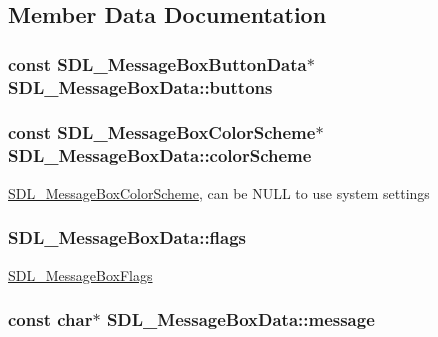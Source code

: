 \subsection{Member Data Documentation}
\hypertarget{struct_s_d_l___message_box_data_a265e47aab749e384661ae91d3e11e0db}{
\subsubsection[{buttons}]{\setlength{\rightskip}{0pt plus 5cm}const {\bf S\-D\-L\-\_\-\-Message\-Box\-Button\-Data}$\ast$ S\-D\-L\-\_\-\-Message\-Box\-Data\-::buttons}}\label{struct_s_d_l___message_box_data_a265e47aab749e384661ae91d3e11e0db}
\hypertarget{struct_s_d_l___message_box_data_a18744865a3e89e260db5f01aee579e35}{
\subsubsection[{color\-Scheme}]{\setlength{\rightskip}{0pt plus 5cm}const {\bf S\-D\-L\-\_\-\-Message\-Box\-Color\-Scheme}$\ast$ S\-D\-L\-\_\-\-Message\-Box\-Data\-::color\-Scheme}}\label{struct_s_d_l___message_box_data_a18744865a3e89e260db5f01aee579e35}
\hyperlink{struct_s_d_l___message_box_color_scheme}{S\-D\-L\-\_\-\-Message\-Box\-Color\-Scheme}, can be N\-U\-L\-L to use system settings \hypertarget{struct_s_d_l___message_box_data_a113d016f760bf4e4156b0f376358d6a0}{
\subsubsection[{flags}]{ S\-D\-L\-\_\-\-Message\-Box\-Data\-::flags}}\label{struct_s_d_l___message_box_data_a113d016f760bf4e4156b0f376358d6a0}
\hyperlink{_s_d_l__messagebox_8h_a97f06819ac610581044fdb93d81eed37}{S\-D\-L\-\_\-\-Message\-Box\-Flags} \hypertarget{struct_s_d_l___message_box_data_ada6ae208a1f85adabbd7a7a08ca609c8}{
\subsubsection[{message}]{\setlength{\rightskip}{0pt plus 5cm}const char$\ast$ S\-D\-L\-\_\-\-Message\-Box\-Data\-::message}}\label{struct_s_d_l___message_box_data_ada6ae208a1f85adabbd7a7a08ca609c8}
